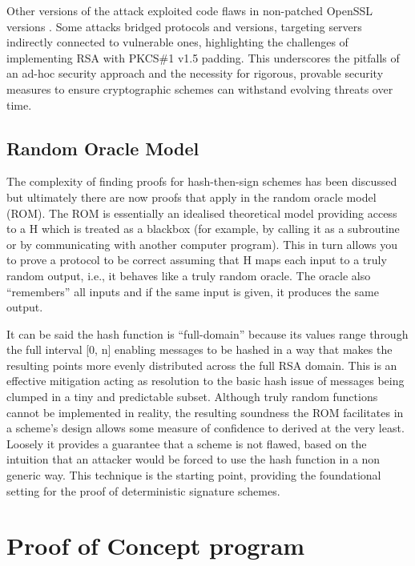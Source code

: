 \documentclass[]{final_report}
\theoremstyle{definition}
\begin{document}
Other versions of the attack exploited code flaws in non-patched OpenSSL versions \cite{CVE-2006-4339}. Some attacks bridged protocols and versions, targeting servers indirectly connected to vulnerable ones, highlighting the challenges of implementing RSA with PKCS\#1 v1.5 padding. This underscores the pitfalls of an ad-hoc security approach and the necessity for rigorous, provable security measures to ensure cryptographic schemes can withstand evolving threats over time.


\section{Random Oracle Model}
\label{subSec:ROM}
The complexity of finding proofs for hash-then-sign schemes has been discussed but ultimately there are now proofs that apply in the random oracle model (ROM). The ROM is essentially an idealised theoretical model providing access to a H which is treated as a blackbox (for example, by calling it as a subroutine or by communicating with another computer program). This in turn allows you to prove a protocol to be correct assuming that H maps each input to a truly random output, i.e., it behaves like a truly random oracle. 
The oracle also “remembers” all inputs and if the same input is given, it produces the same output. 

It can be said the hash function is “full-domain” because its values range through the full interval [0, n] enabling messages to be hashed in a way that makes the resulting points more evenly distributed across the full RSA domain. This is an effective mitigation acting as resolution to the basic hash issue of messages being clumped in a tiny and predictable subset. 
Although truly random functions cannot be implemented in reality, the resulting soundness the ROM facilitates in a scheme’s design allows some measure of confidence to derived at the very least. Loosely it provides a guarantee that a scheme is not flawed, based on the intuition that an attacker would be forced to use the hash function in a non generic way. This technique is the starting point, providing the foundational setting for the proof of deterministic signature schemes.








\chapter{Proof of Concept program}
\end{document}
